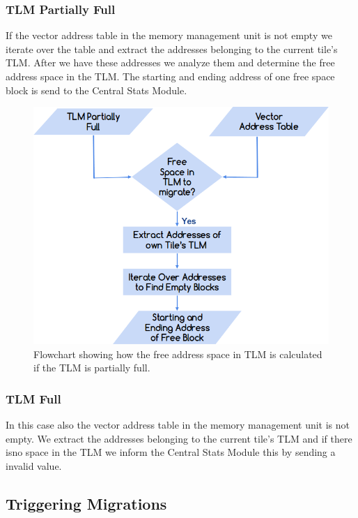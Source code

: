 \documentclass{listhesis}
\begin{document}
\subsubsection{TLM Partially Full}
If the vector address table in the memory management unit is not empty we iterate over the table and extract the addresses belonging to the current tile's TLM. After we have these addresses we analyze them and determine the free address space in the TLM. The starting and ending address of one free space block is send to the Central Stats Module.\\
\begin{figure}
  \includegraphics[width=0.7\linewidth]{tlmpartiallyempty.png}
  \centering
  \caption{Flowchart showing how the free address space in TLM is calculated if the TLM is partially full.}
  \label{fig:freeSpaceTLM}
\end{figure}
\subsubsection{TLM Full}
In this case also the vector address table in the memory management unit is not empty. We extract the addresses belonging to the current tile's TLM and if there isno space in the TLM we inform the Central Stats Module this by sending a invalid value.\\
\subsection{Triggering Migrations}
\end{document}
